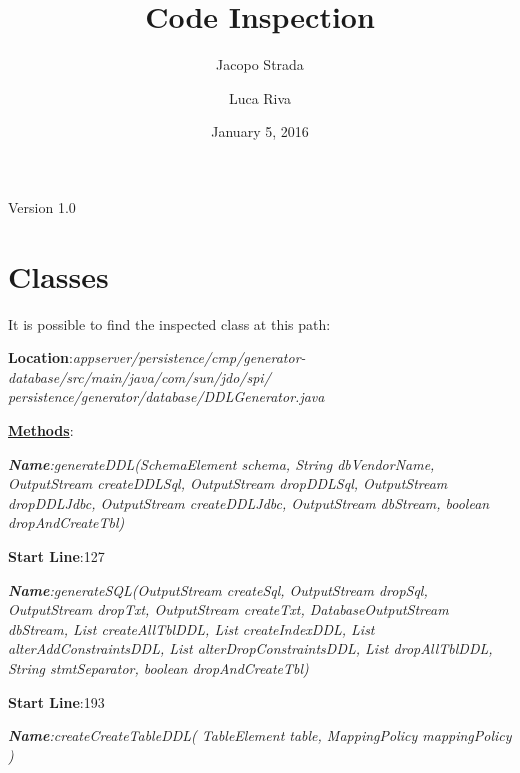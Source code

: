 \documentclass[a4paper]{article}
\title{Code Inspection}
\author{Jacopo Strada \and Luca Riva}
\date{January 5, 2016}
\begin{document}
\maketitle
\vfill
\begin{flushright}
Version 1.0
\end{flushright}

\newpage

\tableofcontents

\vfill

\lstlistoflistings

\vfill

\let\stdsection\section
\renewcommand\section{\newpage\stdsection}

\setlength{\parindent}{0em}
\setlength{\parskip}{1em}

\section{Classes}

It is possible to find the inspected class at this path:


\textbf{Location}:\textit{appserver/persistence/cmp/generator-database/src/main/java/com/sun/jdo/spi/\\persistence/generator/database/DDLGenerator.java}


\underline{\textbf{Methods}}:


\textit{\textbf{Name}:generateDDL(SchemaElement schema, String dbVendorName, OutputStream createDDLSql, OutputStream dropDDLSql, OutputStream dropDDLJdbc, OutputStream createDDLJdbc, OutputStream dbStream, boolean dropAndCreateTbl)}


\textbf{Start Line}:127


\textit{\textbf{Name}:generateSQL(OutputStream createSql, OutputStream dropSql, OutputStream dropTxt, OutputStream createTxt, DatabaseOutputStream dbStream, List createAllTblDDL, List createIndexDDL, List alterAddConstraintsDDL, List alterDropConstraintsDDL, List dropAllTblDDL, String stmtSeparator, boolean dropAndCreateTbl)}


\textbf{Start Line}:193


\textit{\textbf{Name}:createCreateTableDDL( TableElement table, MappingPolicy mappingPolicy )}
\end{document}
